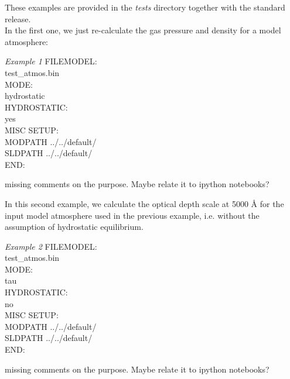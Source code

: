 %

These examples are provided in the {\it tests} directory together with the standard release.\\

In the first one, we just re-calculate the gas pressure and density for a model atmosphere:

\begin{ifbox}[label={tb:example01}]{{\it Example 1}}
  \scriptsize
FILEMODEL:\\
test\_atmos.bin\\
MODE:\\
hydrostatic\\
HYDROSTATIC:\\
yes\\
MISC SETUP:\\
MODPATH ../../default/\\
SLDPATH ../../default/\\
END:
  \normalsize
\end{ifbox}

{\Huge missing comments on the purpose. Maybe relate it to ipython notebooks?}

%

In this second example, we calculate the optical depth scale at 5000 {\AA} for the input model atmosphere used in the previous example, i.e. without the assumption of hydrostatic equilibrium.\\

\begin{ifbox}[label={tb:example02}]{{\it Example 2}}
  \scriptsize
FILEMODEL:\\
test\_atmos.bin\\
MODE:\\
tau\\
HYDROSTATIC:\\
no\\
MISC SETUP:\\
MODPATH ../../default/\\
SLDPATH ../../default/\\
END:
  \normalsize
\end{ifbox}

{\Huge missing comments on the purpose. Maybe relate it to ipython notebooks?}

%

